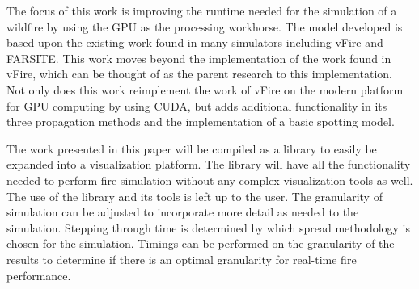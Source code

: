 The focus of this work is improving the runtime needed for the simulation of a wildfire by using the GPU as the processing workhorse. The model developed is based upon the existing work found in many simulators including vFire and FARSITE. This work moves beyond the implementation of the work found in vFire, which can be thought of as the parent research to this implementation. Not only does this work reimplement the work of vFire on the modern platform for GPU computing by using CUDA, but adds additional functionality in its three propagation methods and the implementation of a basic spotting model. 

The work presented in this paper will be compiled as a library to easily be expanded into a visualization platform. The library will have all the functionality needed to perform fire simulation without any complex visualization tools as well. The use of the library and its tools is left up to the user. The granularity of simulation can be adjusted to incorporate more detail as needed to the simulation. Stepping through time is determined by which spread methodology is chosen for the simulation. Timings can be performed on the granularity of the results to determine if there is an optimal granularity for real-time fire performance. 

